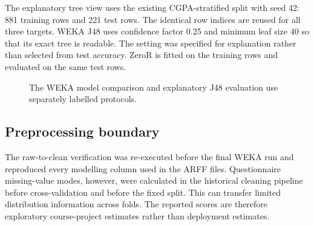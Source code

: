 The explanatory tree view uses the existing CGPA-stratified split with seed 42: 881 training rows and 221 test rows. The identical row indices are reused for all three targets. WEKA J48 uses confidence factor 0.25 and minimum leaf size 40 so that its exact tree is readable. The setting was specified for explanation rather than selected from test accuracy. ZeroR is fitted on the training rows and evaluated on the same test rows.

\begin{figure}[H]\centering
{}
\caption{The WEKA model comparison and explanatory J48 evaluation use separately labelled protocols.}
\label{fig:evaluation-flow}
\end{figure}

\subsection{Preprocessing boundary}
The raw-to-clean verification was re-executed before the final WEKA run and reproduced every modelling column used in the ARFF files. Questionnaire missing-value modes, however, were calculated in the historical cleaning pipeline before cross-validation and before the fixed split. This can transfer limited distribution information across folds. The reported scores are therefore exploratory course-project estimates rather than deployment estimates.

